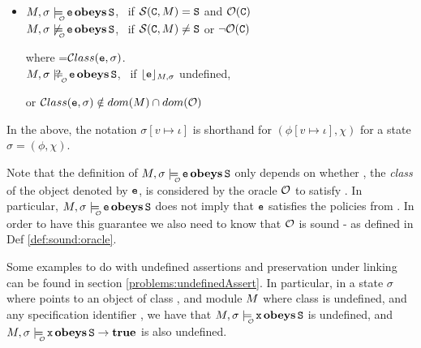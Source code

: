 \begin{definition}
\begin{itemize}
  \item
{$\M, \sigma  \modelsWithO \sE \obeys \prg{S}   $},  \  {if ${\cal S}({\textrm{\ttfamily{C}}},M)= {\textrm{\ttfamily{S}}}$ and ${\cal O}({\textrm{\ttfamily{C}}})$}
   \\
 {$\M, \sigma  \not\modelsWithO \sE \obeys \prg{S}   $},  \     {if ${\cal S}({\textrm{\ttfamily{C}}},M)\neq {\ensuremath{\textrm{\ttfamily{S}}}}$ or $\neg {\ensuremath{\cal O}}({\textrm{\ttfamily{C}}})$}
 \\
\strut \hspace{1in} where =${\cal C}lass({{\textrm{\ttfamily{e}}}},\sigma)$.  
  \\
{$\M, \sigma  \modelsWithOQ \sE \obeys \prg{S}   $},  \   if
  ${\lfloor{ { {{{\ensuremath{\textrm{\ttfamily{e}}}}}}}}\rfloor_{M,\sigma}}$ undefined,  \\
\strut  \hspace{1in} or ${\cal C}lass({{\textrm{\ttfamily{e}}}},\sigma) \notin dom(M)\cap dom({\cal O})$

 \end{itemize}
 In the above, the  notation   {$\sigma[v{\mapsto} \iota]$} is shorthand for
$(\phi[v{\mapsto}\iota],\chi)$ for a state $\sigma = (\phi,\chi)$.
 \end{definition}

 {Note that the definition of  $\M, \sigma  \modelsWithO \sE \obeys \prg{S}   $   only depends on whether 
  ,    the {\em class} of the object denoted by ${{\textrm{\ttfamily{e}}}}$,  is considered by the oracle ${\cal O}$ to satisfy  . In particular, $\M, \sigma  \modelsWithO \sE \obeys \prg{S}   $  does not imply that ${{\textrm{\ttfamily{e}}}}$  satisfies the policies from  .  In order to have this guarantee we also need to know that ${\cal O}$ is sound - as defined in Def \ref{def:sound:oracle}.}

{Some examples to do with undefined assertions and preservation under linking can be found in section
\ref{problems:undefinedAssert}. In particular, in a state $\sigma$
where  points to an object of class , and module $M$
 where  class  is undefined, and any specification identifier , we have that
$\M, \sigma  \modelsWithO \prg{x} \obeys \prg{S}$ is undefined, and
$\M, \sigma  \modelsWithO \prg{x} \obeys \prg{S} \rightarrow \kw{true}$ is also undefined.
 }

